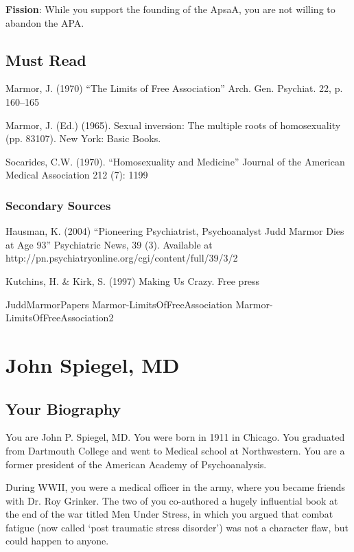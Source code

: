 \begin{refsection}
\textbf{Fission}: While you support the founding of the ApsaA, you are not willing to abandon the APA.

\section{Must Read}
\label{mustread}

Marmor, J. (1970) “The Limits of Free Association” Arch. Gen. Psychiat. 22, p. 160--165

Marmor, J. (Ed.) (1965). Sexual inversion: The multiple roots of homosexuality (pp. 83107). New York: Basic Books.

Socarides, C.W. (1970). “Homosexuality and Medicine” Journal of the American Medical Association 212 (7): 1199

\subsection{Secondary Sources}
\label{secondarysources}

Hausman, K. (2004) “Pioneering Psychiatrist, Psychoanalyst Judd Marmor Dies at Age 93” Psychiatric News, 39 (3). Available at http:\slash \slash pn.psychiatryonline.org\slash cgi\slash content\slash full\slash 39\slash 3\slash 2

Kutchins, H. \& Kirk, S. (1997) Making Us Crazy. Free press

JuddMarmorPapers
Marmor-LimitsOfFreeAssociation
Marmor-LimitsOfFreeAssociation2

\chapter{John Spiegel, MD}
\label{johnspiegelmd}

\section{Your Biography}
\label{yourbiography}

You are John P. Spiegel, MD. You were born in 1911 in Chicago. You graduated from Dartmouth College and went to Medical school at Northwestern. You are a former president of the American Academy of Psychoanalysis.

During WWII, you were a medical officer in the army, where you became friends with Dr. Roy Grinker. The two of you co-authored a hugely influential book at the end of the war titled Men Under Stress, in which you argued that combat fatigue (now called `post traumatic stress disorder') was not a character flaw, but could happen to anyone.


\end{refsection}

